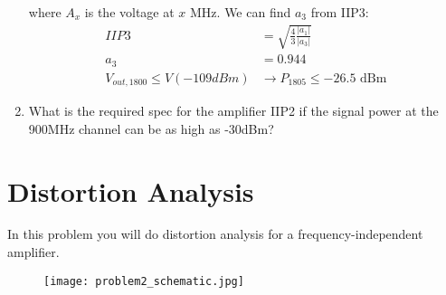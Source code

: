 \begin{enumerate}[label=(\alph*)]
    where $A_{x}$ is the voltage at $x$ MHz. We can find $a_3$ from IIP3:
    \begin{align*}
        IIP3 &= \sqrt{\frac{4}{3} \frac{|a_1|}{|a_3|}} \\
        a_3 &= 0.944 \\
        V_{out,1800} \leq V(-109 dBm) &\rightarrow P_{1805} \leq -26.5 \text{ dBm}
    \end{align*}

    \item {\color{blue}What is the required spec for the amplifier IIP2 if the signal power at the 900MHz channel can be as high as -30dBm?}
\end{enumerate}

\section{Distortion Analysis}
{\color{blue} In this problem you will do distortion analysis for a frequency-independent amplifier.}
\begin{figure}[H]
    \centering \texttt{[image: problem2\_schematic.jpg]}
\end{figure}


